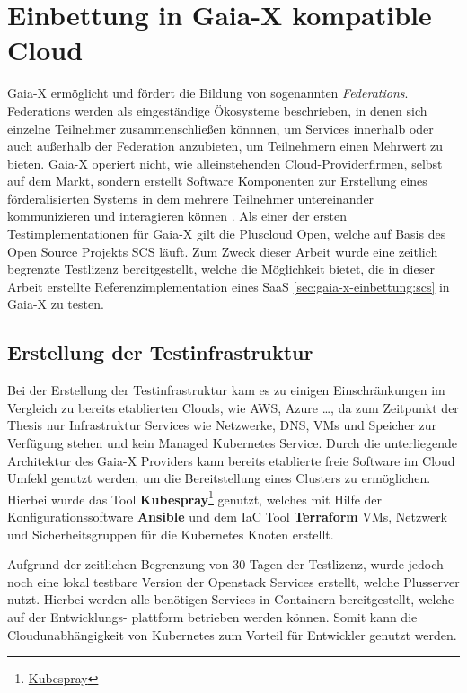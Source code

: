 \chapter{Einbettung in Gaia-X kompatible Cloud}
\label{chapter:gaia-x-einbettung}
Gaia-X ermöglicht und fördert die Bildung von sogenannten \emph{Federations}. 
Federations werden als eingeständige Ökosysteme beschrieben, in denen sich einzelne Teilnehmer zusammenschließen könnnen,
um Services innerhalb oder auch außerhalb der Federation anzubieten, um Teilnehmern einen Mehrwert zu bieten.
Gaia-X operiert nicht, wie alleinstehenden Cloud-Providerfirmen, selbst auf dem Markt, sondern erstellt 
Software Komponenten zur Erstellung eines förderalisierten Systems in dem mehrere Teilnehmer 
untereinander kommunizieren und interagieren können \cite{GXFS2021}.
Als einer der ersten Testimplementationen für Gaia-X gilt die Pluscloud Open, 
welche auf Basis des Open Source Projekts \ac{SCS} läuft.
Zum Zweck dieser Arbeit wurde eine zeitlich begrenzte Testlizenz bereitgestellt, 
welche die Möglichkeit bietet, die in dieser Arbeit erstellte Referenzimplementation eines \ac{SaaS} \ref{sec:gaia-x-einbettung:scs} in Gaia-X zu testen.


\section{Erstellung der Testinfrastruktur}
\label{sec:gaia-x-einbettung:erstellung-testinfra}
Bei der Erstellung der Testinfrastruktur kam es zu einigen Einschränkungen im Vergleich zu bereits etablierten Clouds, 
wie \ac{AWS}, Azure \dots, da zum Zeitpunkt der Thesis nur Infrastruktur Services wie Netzwerke, DNS, \acp{VM} und Speicher 
zur Verfügung stehen und kein Managed Kubernetes Service.
Durch die unterliegende Architektur des Gaia-X Providers kann bereits etablierte freie Software
im Cloud Umfeld genutzt werden, um die Bereitstellung eines Clusters zu ermöglichen.
Hierbei wurde das Tool \textbf{Kubespray}\footnote{\href{https://github.com/kubernetes-sigs/kubespray}{Kubespray}} genutzt,
welches mit Hilfe der Konfigurationssoftware \textbf{Ansible} und dem \ac{IaC} Tool \textbf{Terraform} 
\acp{VM}, Netzwerk und Sicherheitsgruppen für die Kubernetes Knoten erstellt. 

Aufgrund der zeitlichen Begrenzung von 30 Tagen der Testlizenz, wurde jedoch noch eine lokal 
testbare Version der Openstack Services erstellt, welche Plusserver nutzt.
Hierbei werden alle benötigen Services in Containern bereitgestellt, welche auf der Entwicklungs-
plattform betrieben werden können. 
Somit kann die Cloudunabhängigkeit von Kubernetes zum Vorteil für Entwickler genutzt werden.


